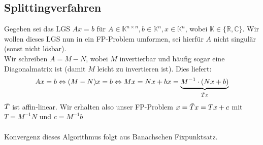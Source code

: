 \documentclass{article}
\begin{document}
\subsection{Splittingverfahren}
Gegeben sei das LGS $Ax=b$ für $A\in\mathbb{K}^{n\times n}, b\in\mathbb{K}^n, x\in\mathbb{K}^n$, wobei $\mathbb{K}\in\{\mathbb{R}, \mathbb{C}\}$. Wir wollen dieses LGS nun in ein FP-Problem umformen, sei hierfür $A$ nicht singulär (sonst nicht lösbar). \\
Wir schreiben $A=M-N$, wobei $M$ invertierbar und häufig sogar eine Diagonalmatrix ist (damit $M$ leicht zu invertieren ist). Dies liefert:
\[Ax = b \Leftrightarrow (M-N)x=b \Leftrightarrow Mx=Nx+b x=\underbrace{M^{-1}\cdot(Nx+b)}_{\Tilde{T}x}\]
$\Tilde{T}$ ist affin-linear. Wir erhalten also unser FP-Problem $x=\Tilde{T}x=Tx+c$ mit $T=M^{-1}N$ und $c=M^{-1}b$ \\ \\

Konvergenz dieses Algorithmus folgt aus Banachschen Fixpunktsatz.
\end{document}
